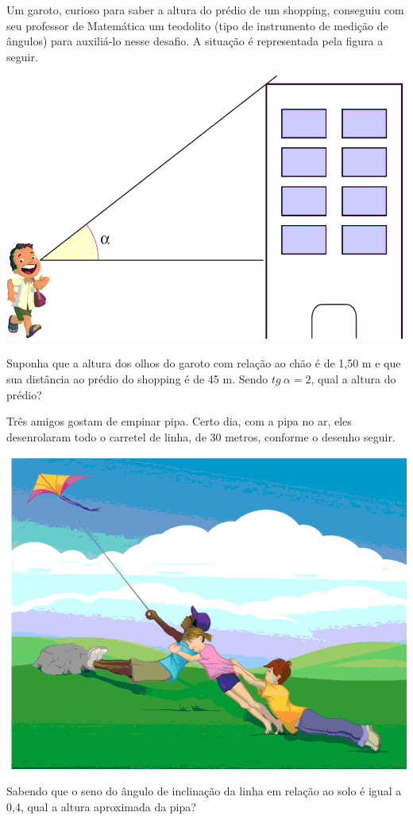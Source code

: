\item Um garoto, curioso para saber a altura do prédio de um shopping, conseguiu com seu professor de Matemática um teodolito (tipo de instrumento de medição de ângulos) para auxiliá-lo nesse desafio. A situação é representada pela figura a seguir.
\begin{center}
\includegraphics[scale=0.2]{figuras/fig91.png}
\end{center}
Suponha que a altura dos olhos do garoto com relação ao chão é de 1,50 m e que sua distância ao prédio do shopping é de 45 m. Sendo $tg\ \alpha = 2$, qual a altura do prédio?

\item Três amigos gostam de empinar pipa. Certo dia, com a pipa no ar, eles desenrolaram todo o carretel de linha, de 30 metros, conforme o desenho seguir.
\begin{center}
\includegraphics[scale=0.2]{figuras/fig92.png}
\end{center}
Sabendo que o seno do ângulo de inclinação da linha em relação ao solo é igual a 0,4, qual a altura aproximada da pipa?

